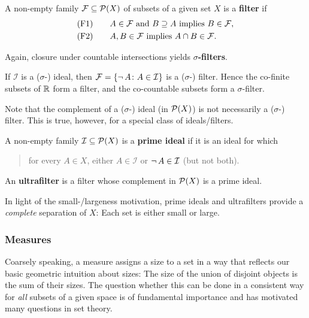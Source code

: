 \begin{definition}\label{def-filter}A non-empty family $\mathcal{F} \subseteq \mathcal{P}(X)$ of subsets of a given set $X$ is a \textbf{filter} if
\begin{align*}
(\operatorname{F1}) & \qquad A \in \mathcal{F} \text{ and } B \supseteq A \text{ implies } B \in \mathcal{F},\\
(\operatorname{F2}) & \qquad A, B \in \mathcal{F}  \text{ implies } A \cap B \in\mathcal{F}.
\end{align*}
\end{definition}Again, closure under countable intersections yields \textbf{$\sigma$-filters}.

If $\mathcal{I}$ is a ($\sigma$-) ideal, then $\mathcal{F} = \{\neg \, A \colon A \in \mathcal{I}\}$ is a ($\sigma$-) filter. Hence the co-finite subsets of $\mathbb{R}$ form a filter, and the co-countable subsets form a $\sigma$-filter.

Note that the complement of a ($\sigma$-) ideal (in $\mathcal{P}(X)$) is not necessarily a ($\sigma$-) filter. This is true, however, for a special class of ideals/filters.

\begin{definition}\label{def-ultrafilter}A non-empty family $\mathcal{I} \subseteq \mathcal{P}(X)$ is a \textbf{prime ideal} if it is an ideal for which

\begin{quote}
for every $A \in X$, either $A\in \mathcal{I}$ or $\neg \, A \in \mathcal{I}$ (but not both).
\end{quote}

An \textbf{ultrafilter} is a filter whose complement in $\mathcal{P}(X)$ is a prime ideal.

\end{definition}In light of the small-/largeness motivation, prime ideals and ultrafilters provide a \textit{complete} separation of $X$: Each set is either small or large.

\subsubsection{Measures}

Coarsely speaking, a measure assigns a size to a set in a way that reflects our basic geometric intuition about sizes: The size of the union of disjoint objects is the sum of their sizes. The question whether this can be done in a consistent way for \textit{all} subsets of a given space is of fundamental importance and has motivated many questions in set theory.


